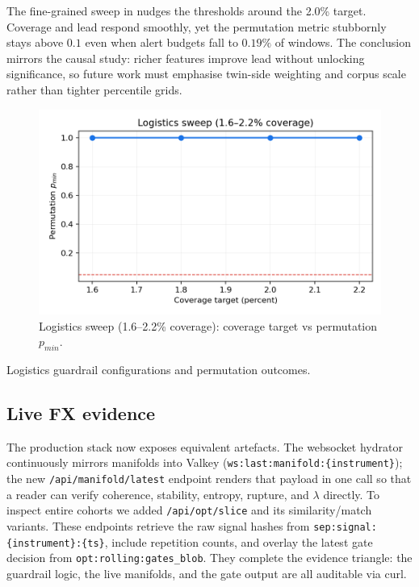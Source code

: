 \documentclass[11pt]{article}
\begin{document}
The fine-grained sweep in
 nudges the thresholds
around the 2.0\% target. Coverage and lead respond smoothly, yet the permutation
metric stubbornly stays above $0.1$ even when alert budgets fall to $0.19\%$ of
windows. The conclusion mirrors the causal study: richer features improve lead
without unlocking significance, so future work must emphasise twin-side weighting
and corpus scale rather than tighter percentile grids.

\begin{figure}[h]
  \centering
  \includegraphics[width=0.72\linewidth]{../figures/fig1_logistics_sweep.png}
  \caption{Logistics sweep (1.6--2.2\% coverage): coverage target vs permutation $p_{min}$.}
  \label{fig:logistics-sweep}
\end{figure}

\begin{table}[h]
  \centering
  \caption{Logistics guardrail configurations and permutation outcomes.}
  \label{tab:stm-guardrail}
  
\end{table}

\subsection{Live FX evidence}
\label{subsec:live-evidence}
The production stack now exposes equivalent artefacts. The websocket hydrator
continuously mirrors manifolds into Valkey
(\texttt{ws:last:manifold:\{instrument\}}); the new
\texttt{/api/manifold/latest} endpoint renders that payload in one call so that a
reader can verify coherence, stability, entropy, rupture, and $\lambda$ directly.
To inspect entire cohorts we added \texttt{/api/opt/slice} and its similarity/match
variants. These endpoints retrieve the raw signal hashes from
\texttt{sep:signal:\{instrument\}:\{ts\}}, include repetition counts, and overlay the
latest gate decision from \texttt{opt:rolling:gates\_blob}. They complete the
evidence triangle: the guardrail logic, the live manifolds, and the gate output
are all auditable via curl.
\end{document}
